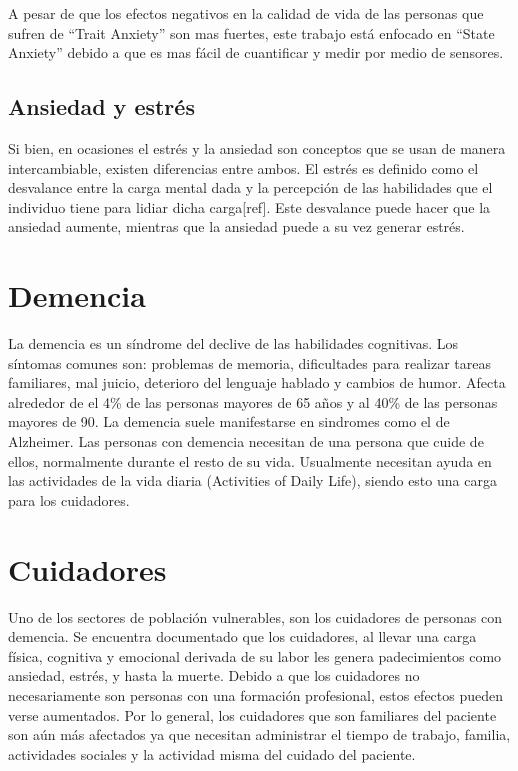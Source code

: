 A pesar de que los efectos negativos en la calidad de vida de las personas que sufren de ``Trait Anxiety'' son mas fuertes, este trabajo est\'a enfocado en ``State Anxiety'' debido a que es mas f\'acil de cuantificar y medir por medio de sensores.

\subsection{Ansiedad y estr\'es}\label{secc:anxietyandstress}
Si bien, en ocasiones el estr\'es y la ansiedad son conceptos que se usan de manera intercambiable, existen diferencias entre ambos. El estr\'es es definido como el desvalance entre la carga mental dada y la percepci\'on de las habilidades que el individuo tiene para lidiar dicha carga[ref]. Este desvalance puede hacer que la ansiedad aumente, mientras que la ansiedad puede a su vez generar estr\'es.

\section{Demencia}\label{secc:dementia}
La demencia es un s\'indrome del declive de las habilidades cognitivas. Los s\'intomas comunes son: problemas de memoria, dificultades para realizar tareas familiares, mal juicio, deterioro del lenguaje hablado y cambios de humor\citep{Aziz}. Afecta alrededor de el 4\% de las personas mayores de 65 a\~nos y al 40\% de las personas mayores de 90. La demencia suele manifestarse en sindromes como el de Alzheimer. Las personas con demencia necesitan de una persona que cuide de ellos, normalmente durante el resto de su vida. Usualmente necesitan ayuda en las actividades de la vida diaria (Activities of Daily Life), siendo esto una carga para los cuidadores.

\section{Cuidadores}\label{secc:caregivers}
Uno de los sectores de poblaci\'on vulnerables, son los cuidadores de personas con demencia. Se encuentra documentado que los cuidadores, al llevar una carga f\'isica, cognitiva y emocional derivada de su labor les genera padecimientos como ansiedad, estr\'es, y hasta la muerte\citep{Chen2013}. Debido a que los cuidadores no necesariamente son personas con una formaci\'on profesional, estos efectos pueden verse aumentados. Por lo general, los cuidadores que son familiares del paciente son a\'un m\'as afectados ya que necesitan administrar el tiempo de trabajo, familia, actividades sociales y la actividad misma del cuidado del paciente.

